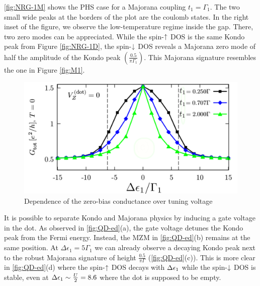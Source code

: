  \ref{fig:NRG-1M} shows the PHS case for a Majorana coupling $t_1=\Gamma_1$. The two small wide peaks at the borders of the plot are the coulomb states. In the right inset of the figure, we observe the low-temperature regime inside the gap. There, two zero modes can be appreciated.  While the spin-$\uparrow$ DOS is the same Kondo peak from Figure \ref{fig:NRG-1D}, the spin-$\downarrow$ DOS reveals a Majorana zero mode of half the amplitude of the Kondo peak $\left(\frac{0.5}{\pi\Gamma_1}\right)$.  This  Majorana signature resembles the one in Figure \ref{fig:M1}.
 \begin{figure}[H]
 \centering
 \includegraphics[scale=0.48]{IMAGES/Majorana/Luis.png}
 \caption{\label{fig:Luis}Dependence of the zero-bias conductance over tuning voltage \protect{}}
 \end{figure}


 It is possible to separate Kondo and Majorana physics by inducing a gate voltage in the dot. As observed in \ref{fig:QD-ed}(a), the gate voltage detunes the Kondo peak from the Fermi energy. Instead, the MZM in \ref{fig:QD-ed}(b) remains at the same position. At $\Delta \epsilon_1 = 5\Gamma_1$ we can already observe a decaying Kondo peak next to the robust Majorana signature of height $\frac{0.5}{\pi\Gamma}$ (\ref{fig:QD-ed}(c)). This is more clear in \ref{fig:QD-ed}(d) where the spin-$\uparrow$ DOS decays with $\Delta \epsilon_1$ while the spin-$\downarrow$ DOS is stable, even at $\Delta \epsilon_1 \sim \frac{U}{2} = 8.6$ where the dot is supposed to be empty. 





